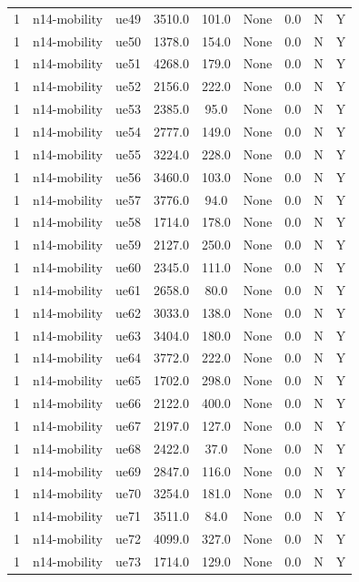 \begin{table}[ht]
\begin{tabular}{|c|c|c|c|c|c|c|c|c|}
1 & n14-mobility & ue49 & 3510.0 & 101.0 & None & 0.0 & N & Y \\
1 & n14-mobility & ue50 & 1378.0 & 154.0 & None & 0.0 & N & Y \\
1 & n14-mobility & ue51 & 4268.0 & 179.0 & None & 0.0 & N & Y \\
1 & n14-mobility & ue52 & 2156.0 & 222.0 & None & 0.0 & N & Y \\
1 & n14-mobility & ue53 & 2385.0 & 95.0 & None & 0.0 & N & Y \\
1 & n14-mobility & ue54 & 2777.0 & 149.0 & None & 0.0 & N & Y \\
1 & n14-mobility & ue55 & 3224.0 & 228.0 & None & 0.0 & N & Y \\
1 & n14-mobility & ue56 & 3460.0 & 103.0 & None & 0.0 & N & Y \\
1 & n14-mobility & ue57 & 3776.0 & 94.0 & None & 0.0 & N & Y \\
1 & n14-mobility & ue58 & 1714.0 & 178.0 & None & 0.0 & N & Y \\
1 & n14-mobility & ue59 & 2127.0 & 250.0 & None & 0.0 & N & Y \\
1 & n14-mobility & ue60 & 2345.0 & 111.0 & None & 0.0 & N & Y \\
1 & n14-mobility & ue61 & 2658.0 & 80.0 & None & 0.0 & N & Y \\
1 & n14-mobility & ue62 & 3033.0 & 138.0 & None & 0.0 & N & Y \\
1 & n14-mobility & ue63 & 3404.0 & 180.0 & None & 0.0 & N & Y \\
1 & n14-mobility & ue64 & 3772.0 & 222.0 & None & 0.0 & N & Y \\
1 & n14-mobility & ue65 & 1702.0 & 298.0 & None & 0.0 & N & Y \\
1 & n14-mobility & ue66 & 2122.0 & 400.0 & None & 0.0 & N & Y \\
1 & n14-mobility & ue67 & 2197.0 & 127.0 & None & 0.0 & N & Y \\
1 & n14-mobility & ue68 & 2422.0 & 37.0 & None & 0.0 & N & Y \\
1 & n14-mobility & ue69 & 2847.0 & 116.0 & None & 0.0 & N & Y \\
1 & n14-mobility & ue70 & 3254.0 & 181.0 & None & 0.0 & N & Y \\
1 & n14-mobility & ue71 & 3511.0 & 84.0 & None & 0.0 & N & Y \\
1 & n14-mobility & ue72 & 4099.0 & 327.0 & None & 0.0 & N & Y \\
1 & n14-mobility & ue73 & 1714.0 & 129.0 & None & 0.0 & N & Y \\

\end{tabular}
\end{table}
